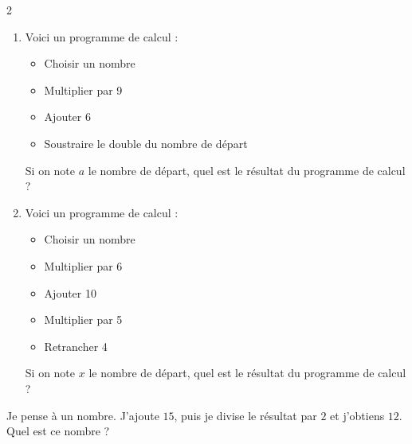 \documentclass[11pt]{article}
\begin{document}
\phantom{0}
\vspace{-.5cm}




\begin{exercicedevoir}[1]
  \begin{multicols}{2}
\begin{enumerate}[itemsep=1em]

  \item \setlength\itemsep{1em}Voici un programme de calcul : 
    \begin{itemize}
    \item Choisir un nombre
    \item Multiplier par 9
    \item Ajouter 6
    \item Soustraire le double du nombre de départ
    \end{itemize}Si on note $a$ le nombre de départ, quel est le résultat du programme de calcul ?
  \item Voici un programme de calcul : 
    \begin{itemize}
    \item Choisir un nombre
    \item Multiplier par 6
    \item Ajouter 10
    \item Multiplier par 5
    \item Retrancher 4
    \end{itemize}Si on note $x$ le nombre de départ, quel est le résultat du programme de calcul ?
  \end{enumerate}
\end{multicols}
\end{exercicedevoir}


\begin{exercicedevoir}[1]

Je pense à un nombre. J'ajoute $15$, puis je divise le résultat par $2$ et j'obtiens $12$. \\

Quel est ce nombre ?
\end{exercicedevoir}
\end{document}
